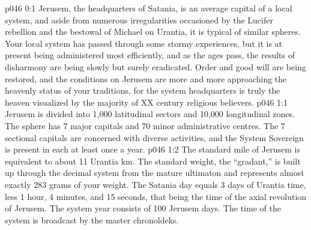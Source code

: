\author{Archangel}
\vs p046 0:1 Jerusem, the headquarters of Satania, is an average capital of a local system, and aside from numerous irregularities occasioned by the Lucifer rebellion and the bestowal of Michael on Urantia, it is typical of similar spheres. Your local system has passed through some stormy experiences, but it is at present being administered most efficiently, and as the ages pass, the results of disharmony are being slowly but surely eradicated. Order and good will are being restored, and the conditions on Jerusem are more and more approaching the heavenly status of your traditions, for the system headquarters is truly the heaven visualized by the majority of XX century religious believers.
\vs p046 1:1 Jerusem is divided into 1,000 latitudinal sectors and 10,000 longitudinal zones. The sphere has 7 major capitals and 70 minor administrative centres. The 7 sectional capitals are concerned with diverse activities, and the System Sovereign is present in each at least once a year.
\vs p046 1:2 \pc The standard mile of Jerusem is equivalent to about 11 Urantia km. The standard weight, the “gradant,” is built up through the decimal system from the mature ultimaton and represents almost exactly 283 grams of your weight. The Satania day equals 3 days of Urantia time, less 1 hour, 4 minutes, and 15 seconds, that being the time of the axial revolution of Jerusem. The system year consists of 100 Jerusem days. The time of the system is broadcast by the master chronoldeks.
